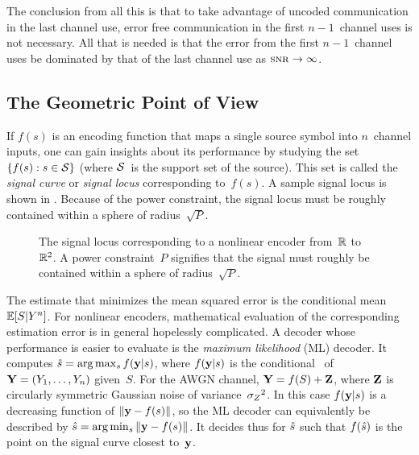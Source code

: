 The conclusion from all this is that to take advantage of uncoded communication
in the last channel use, error free communication in the first $n-1$~channel
uses is not necessary. All that is needed is that the error from the first
$n-1$~channel uses be dominated by that of the last channel use as $\snr \goesto
\infty$. 


\subsection{The Geometric Point of View}\label{sec:geomviewpoint}

If $f(s)$ is an encoding function that maps a single source symbol into
$n$~channel inputs, one can gain insights about its performance by studying the
set $\{f(s): s \in \mathcal{S}\}$ (where $\mathcal{S}$~is the support set of the source). This
set is called the \emph{signal curve} or \emph{signal locus} corresponding
to~$f(s)$. A sample signal locus is shown in . Because of
the power constraint, the signal locus must be roughly contained within a sphere
of radius~$\sqrt{P}$.

\begin{figure}
  \begin{center}
    
  \end{center}
  \caption{The signal locus corresponding to a nonlinear encoder from~$\mathbb{R}$
  to~$\mathbb{R}^2$. A power constraint~$P$ signifies that the signal must roughly be
  contained within a sphere of radius~$\sqrt{P}$.}
  \label{fig:nonlinlocus}
\end{figure}

The estimate that minimizes the mean squared error is the conditional mean $\mathbb{E}[S
| Y^n]$. For nonlinear encoders, mathematical evaluation of the corresponding
estimation error is in general hopelessly complicated. A decoder whose
performance is easier to evaluate is the \emph{maximum likelihood} (ML) decoder.
It computes ${\hat{s}} = \arg\max_{s} f(\mathbf{y}|s)$, where $f(\mathbf{y}|s)$ is the conditional
\pdf\ of~$\mathbf{Y} = (Y_1, \dots, Y_n)$ given~$S$. For the AWGN channel, $\mathbf{Y} = f(S) +
\mathbf{Z}$, where $\mathbf{Z}$ is circularly symmetric Gaussian noise of variance~${{\sigma_Z}^2}$. In
this case $f(\mathbf{y}|s)$ is a decreasing function of $\|\mathbf{y} - f(s)\|$, so the ML
decoder can equivalently be described by ${\hat{s}} = \arg\min_{s} \|\mathbf{y} - f(s)\|$. It
decides thus for ${\hat{s}}$ such that $f({\hat{s}})$ is the point on the signal curve
closest to~$\mathbf{y}$. 

